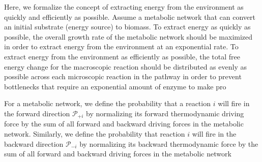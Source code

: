 Here, we formalize the concept of extracting energy from the environment as quickly and efficiently as possible. Assume a metabolic network that can convert an initial substrate (energy source) to biomass. To extract energy as quickly as possible, the overall growth rate of the metabolic network should be maximized in order to extract energy from the environment at an exponential rate.   To extract energy from the environment as efficiently as possible, the total free energy change for the macroscopic reaction should be distributed as evenly as possible across each microscopic reaction in the pathway in order to prevent bottlenecks that require an exponential amount of enzyme to make pro


For a metabolic network, we define the probability that a reaction $i$ will fire in the forward  direction ${\mathcal P_{+i}}$ by normalizing its forward thermodynamic driving force by the sum of all forward and backward driving forces in the metabolic network. Similarly, we define the probability that reaction $i$ will fire in the backward direction $\mathcal P_{-i}$ by normalizing its backward thermodynamic force by  the sum of all forward and backward driving forces in the metabolic network